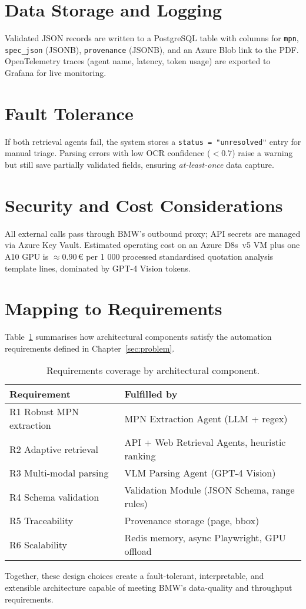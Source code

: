 \section{Data Storage and Logging}
Validated JSON records are written to a PostgreSQL table with columns for \verb|mpn|, \verb|spec_json| (JSONB), \verb|provenance| (JSONB), and an Azure Blob link to the PDF.  
OpenTelemetry traces (agent name, latency, token usage) are exported to Grafana for live monitoring.

\section{Fault Tolerance}
If both retrieval agents fail, the system stores a \verb|status = "unresolved"| entry for manual triage.  
Parsing errors with low OCR confidence ($<0.7$) raise a warning but still save partially validated fields, ensuring \emph{at-least-once} data capture.

\section{Security and Cost Considerations}
All external calls pass through BMW's outbound proxy; API secrets are managed via Azure Key Vault.  
Estimated operating cost on an Azure D8s~v5 VM plus one A10 GPU is \(\approx 0.90\,€\) per 1 000 processed standardised quotation analysis template lines, dominated by GPT-4 Vision tokens.

\section{Mapping to Requirements}
Table~\ref{tab:reqmap} summarises how architectural components satisfy the automation requirements defined in Chapter~\ref{sec:problem}.

\begin{table}[ht]
  \centering
  \caption{Requirements coverage by architectural component.}
  \label{tab:reqmap}
  \begin{tabular}{ll}
    \hline
    Requirement & Fulfilled by \\\hline
    R1 Robust MPN extraction & MPN Extraction Agent (LLM + regex) \\
    R2 Adaptive retrieval    & API + Web Retrieval Agents, heuristic ranking \\
    R3 Multi-modal parsing   & VLM Parsing Agent (GPT-4 Vision) \\
    R4 Schema validation     & Validation Module (JSON Schema, range rules) \\
    R5 Traceability          & Provenance storage (page, bbox) \\
    R6 Scalability           & Redis memory, async Playwright, GPU offload \\\hline
  \end{tabular}
\end{table}

Together, these design choices create a fault-tolerant, interpretable, and extensible architecture capable of meeting BMW's data-quality and throughput requirements.
